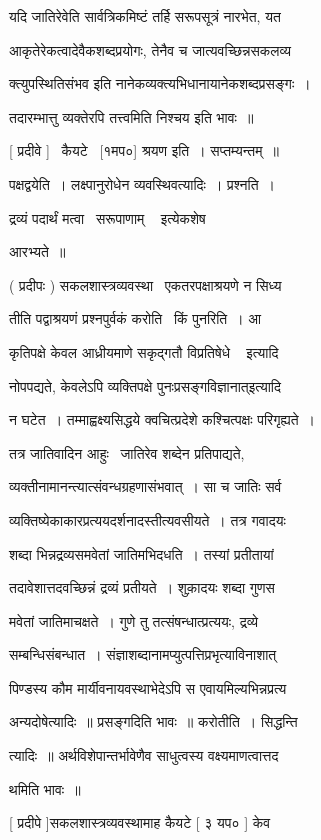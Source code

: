 \documentclass[11pt, openany]{book}
\begin{document}
यदि जातिरेवेति सार्वत्रिकमिष्टं तर्हि सरूपसूत्रं नारभेत, यत 

आकृतेरेकत्वादेवैकशब्दप्रयोगः, तेनैव च जात्यवच्छिन्नसकलव्य \textendash\ 

क्त्युपस्थितिसंभव इति नानेकव्यक्त्यभिधानायानेकशब्दप्रसङ्गः~। 

तदारम्भात्तु व्यक्तेरपि तत्त्वमिति निश्चय इति भावः~॥ 

[ प्रदीवे ] \textendash\ कैयटे \textendash\ [१मप०] श्रयण इति~। सप्तम्यन्तम्~॥ 

पक्षद्वयेति~। लक्ष्पानुरोधेन व्यवस्थिवत्यादिः~। प्रश्नति~। 



द्रव्यं पदार्थं मत्वा \textendash\ {\qt सरूपाणाम् \textendash\ } इत्येकशेष 

आरभ्यते~॥ 

( प्रदीपः ) सकलशास्त्रव्यवस्था \textendash\ एकतरपक्षाश्रयणे न सिध्य \textendash\ 

तीति पद्वाश्रयणं प्रश्नपुर्वकं करोति \textendash\ किं पुनरिति~। आ \textendash\ 

कृतिपक्षे केवल आध्रीयमाणे {\qt सकृद्गतौ विप्रतिषेधे \textendash\ } इत्यादि 

नोपपद्यते, केवलेऽपि व्यक्तिपक्षे {\qt पुनःप्रसङ्गविज्ञानात्}इत्यादि 

न घटेत~। तम्माह्वक्ष्यसिद्धये क्वचित्प्रदेशे कश्चित्पक्षः परिगृह्यते~। 


तत्र जातिवादिन आहुः \textendash\ जातिरेव शब्देन प्रतिपाद्यते, 

व्यक्तीनामानन्त्यात्संवन्धग्रहणासंभवात्~। सा च जातिः सर्व \textendash\ 

व्यक्तिष्येकाकारप्रत्ययदर्शनादस्तीत्यवसीयते~। तत्र गवादयः 

शब्दा भिन्नद्रव्यसमवेतां जातिमभिदधति~। तस्यां प्रतीतायां 

तदावेशात्तदवच्छिन्नं द्रव्यं प्रतीयते~। शुक़ादयः शब्दा गुणस \textendash\ 

मवेतां जातिमाचक्षते~। गुणे तु तत्संषन्धात्प्रत्ययः, द्रव्ये 

सम्बन्धिसंबन्धात~। संज्ञाशब्दानामप्युत्पत्तिप्रभृत्याविनाशात् 

पिण्डस्य कौम मार्यीवनायवस्थाभेदेऽपि स एवायमिल्यभिन्नप्रत्य \textendash\ 



अन्यदोषेत्यादिः~॥ प्रसङ्गदिति भावः~॥ करोतीति~। सिद्धन्ति 

त्यादिः~॥ अर्थविशेपान्तर्भावेणैव साधुत्वस्य वक्ष्यमाणत्वात्तद \textendash\ 

थमिति भावः~॥ 

[ प्रदीपे ]सकलशास्त्रव्यवस्थामाह कैयटे [ ३ यप० ] केव \textendash\ 
\end{document}
